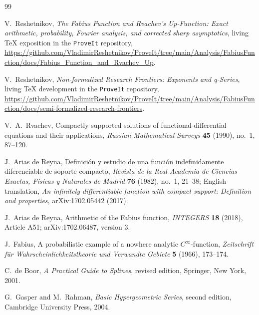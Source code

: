 \documentclass[11pt]{article}
\theoremstyle{definition}
\theoremstyle{remark}
\begin{document}
\begingroup\sloppy\begin{thebibliography}{99}

V.~Reshetnikov,
\newblock \emph{The Fabius Function and Rvachev's Up-Function: Exact arithmetic,
probability, Fourier analysis, and corrected sharp asymptotics},
\newblock living TeX exposition in the \texttt{ProveIt} repository,
\newblock \url{https://github.com/VladimirReshetnikov/ProveIt/tree/main/Analysis/FabiusFunction/docs/Fabius_Function_and_Rvachev_Up}.

V.~Reshetnikov,
\newblock \emph{Non-formalized Research Frontiers: Exponents and q-Series},
\newblock living TeX development in the \texttt{ProveIt} repository,
\newblock \url{https://github.com/VladimirReshetnikov/ProveIt/tree/main/Analysis/FabiusFunction/docs/semi-formalized-research-frontiers}.

V.~A.~Rvachev,
\newblock Compactly supported solutions of functional-differential equations
and their applications,
\newblock \emph{Russian Mathematical Surveys} \textbf{45} (1990), no.~1,
87--120.

J.~Arias de Reyna,
\newblock Definici\'on y estudio de una funci\'on indefinidamente diferenciable
de soporte compacto,
\newblock \emph{Revista de la Real Academia de Ciencias Exactas, F\'isicas y
Naturales de Madrid} \textbf{76} (1982), no.~1, 21--38;
English translation, \emph{An infinitely differentiable function with compact
support: Definition and properties}, arXiv:1702.05442 (2017).

J.~Arias de Reyna,
\newblock Arithmetic of the Fabius function,
\newblock \emph{INTEGERS} \textbf{18} (2018), Article A51;
arXiv:1702.06487, version 3.

J.~Fabius,
\newblock A probabilistic example of a nowhere analytic \(C^\infty\)-function,
\newblock \emph{Zeitschrift f\"ur Wahrscheinlichkeitstheorie und Verwandte
Gebiete} \textbf{5} (1966), 173--174.

C.~de Boor,
\newblock \emph{A Practical Guide to Splines}, revised edition,
\newblock Springer, New York, 2001.

G.~Gasper and M.~Rahman,
\newblock \emph{Basic Hypergeometric Series}, second edition,
\newblock Cambridge University Press, 2004.

\end{thebibliography}\endgroup
\end{document}
